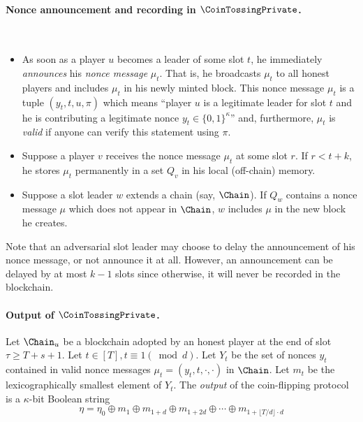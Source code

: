 \paragraph{Nonce announcement and recording in $\CoinTossingPrivate$.}~ 
\begin{itemize}
	\item As soon as a player $u$ becomes a leader of some slot $t$, 
	he immediately \emph{announces} his \emph{nonce message} $\mu_t$. 
	That is, he broadcasts $\mu_t$ to all honest players 
	and includes $\mu_t$ in his newly minted block. 
	This nonce message $\mu_t$ is a tuple $(y_t, t, u, \pi)$ 
	which means ``player $u$ is a legitimate leader for slot $t$ and 
	he is contributing a legitimate nonce $y_t \in \{0,1\}^\kappa$'' and, furthermore, 
	$\mu_t$ is \emph{valid} if anyone can verify this statement using $\pi$. 

	\item Suppose a player $v$ receives the nonce message $\mu_t$ at some slot $r$. 
	If $r< t + k$, he stores $\mu_t$ permanently in a set $Q_v$ in his local (off-chain) memory.

	\item Suppose a slot leader $w$ extends a chain (say, $\Chain$). 
	If $Q_w$ contains a nonce message $\mu$ which 
	does not appear in $\Chain$, 
	$w$ includes $\mu$ in the new block he creates.
\end{itemize}
Note that an adversarial slot leader 
may choose to delay the announcement of his nonce message, 
or not announce it at all.
However, an announcement can be delayed by at most $k - 1$ slots since 
otherwise, it will never be recorded in the blockchain.


\paragraph{Output of $\CoinTossingPrivate$.}
Let $\Chain_u$ be a blockchain 
adopted by an honest player 
at the end of slot {\color{red}$\tau \geq T + s + 1$}. 
Let $t \in [T], t \equiv 1 (\bmod d)$. 
Let $Y_t$ be the set of nonces $y_t$
contained in valid nonce messages 
$\mu_t = (y_t, t, \cdot, \cdot)$ 
in $\Chain$. 
Let $m_t$ be the lexicographically smallest element of $Y_t$. 
The \emph{output} of the coin-flipping protocol is a $\kappa$-bit Boolean string 
$$
	\eta = \eta_0 \oplus m_1 \oplus m_{1 + d} \oplus m_{1 + 2d} \oplus \cdots \oplus m_{1 + \lfloor T/d \rfloor \cdot d}
$$ 


